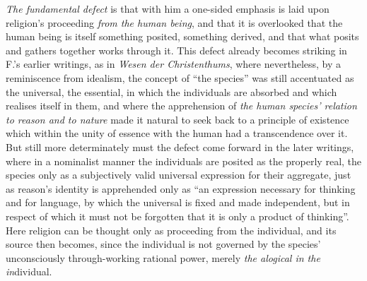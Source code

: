 \documentclass[12pt,a4paper]{book}
\begin{document}
\emph{The fundamental defect} is that with him a one-sided emphasis is laid
upon religion's proceeding \emph{from the human being}, and that it is
overlooked that the human being is itself something posited, something
derived, and that what posits and gathers together works through it. This
defect already becomes striking in F.'s earlier writings, as in \emph{Wesen
der Christenthums}, where nevertheless, by a reminiscence from idealism, the
concept of ``the species'' was still accentuated as the universal, the
essential, in which the individuals are absorbed and which realises itself in
them, and where the apprehension of \emph{the human species' relation to
reason and to nature} made it natural to seek back to a principle of existence
which within the unity of essence with the human had a transcendence over it.
But still more determinately must the defect come forward in the later
writings, where in a nominalist manner the individuals
are posited as the properly real, the species only as a subjectively valid
universal expression for their aggregate, just as reason's identity is
apprehended only as ``an expression necessary for thinking and for language,
by which the universal is fixed and made independent, but in respect of which
it must not be forgotten that it is only a product of thinking''. Here religion can
be thought only as proceeding from the individual, and its source then
becomes, since the individual is not governed by the species' unconsciously
through-working rational power, merely \emph{the alogical in the in}dividual.
\end{document}
